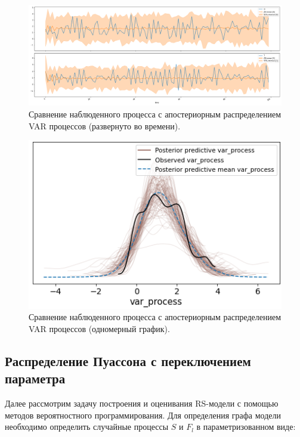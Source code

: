 \documentclass[a4paper,14pt]{extreport}
\begin{document}
\begin{figure}[H]
	\includegraphics[width=\linewidth]{img/gen/pp_var_realization.png}
	\caption{Сравнение наблюденного процесса с апостериорным распределением VAR процессов (развернуто во времени). }
	\label{fig:pp_var_realization}
\end{figure}

\begin{figure}[H]
	\includegraphics[width=\linewidth]{img/gen/pp_var_ppc.png}
	\caption{Сравнение наблюденного процесса с апостериорным распределением VAR процессов (одномерный график). }
	\label{fig:pp_var_ppc}
\end{figure}


\subsection{Распределение Пуассона с переключением параметра}

\label{subsection:ms_pois}

Далее рассмотрим задачу построения и оценивания RS-модели с помощью методов вероятностного программирования. Для определения графа модели необходимо определить случайные процессы $S$ и $F_l$ в параметризованном виде:
\end{document}
